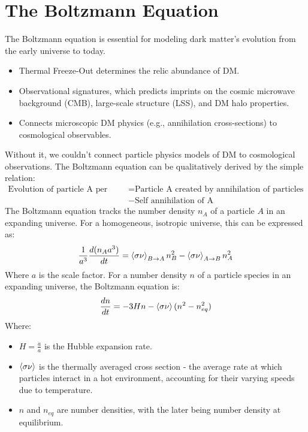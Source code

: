 \documentclass[12pt]{article}
\begin{document}
\section{The Boltzmann Equation}
\label{sec:boltzmann}
The Boltzmann equation is essential for modeling dark matter’s evolution from the early universe to today.
\begin{itemize}
    \item Thermal Freeze-Out determines the relic abundance of DM.
    \item Observational signatures, which predicts imprints on the cosmic microwave background (CMB), large-scale structure (LSS), and DM halo properties.
    \item Connects microscopic DM physics (e.g., annihilation cross-sections) to cosmological observables.
\end{itemize}
Without it, we couldn’t connect particle physics models of DM to cosmological observations. The Boltzmann equation can be qualitatively derived by the simple relation:
\begin{equation}
    \begin{split}
            \text{Evolution of particle A per unit volume} &= \text{Particle A created by annihilation of particles in the bath B} 
            \\&- \text{Self annihilation of A}
    \end{split}
\end{equation}
The Boltzmann equation tracks the number density $n_A$ of a particle $A$ in an expanding universe. For a homogeneous, isotropic universe, this can be expressed as:
\begin{equation}
    \begin{split}
        \frac{1}{a^3}\frac{d(n_Aa^3)}{dt} = \braket{\sigma \nu}_{B \rightarrow A} n^2_B- \braket{\sigma \nu}_{A \rightarrow B}n^2_A
    \end{split}
\end{equation}
Where $a$ is the scale factor. For a number density $n$ of a particle species in an expanding universe, the Boltzmann equation is:
\begin{equation}
    \label{eqn:boltzmann}
    \frac{dn}{dt} = -3Hn - \braket{\sigma\nu}(n^2 - n^2_{eq})
\end{equation}
Where:
\begin{itemize}
    \item $H = \frac{\dot{a}}{a}$ is the Hubble expansion rate.
    \item $\braket{\sigma\nu}$ is the thermally averaged cross section - the average rate at which particles interact in a hot environment, accounting for their varying speeds due to temperature.
    \item $n$ and $n_{eq}$ are number densities, with the later being number density at equilibrium.
\end{itemize}
\end{document}
